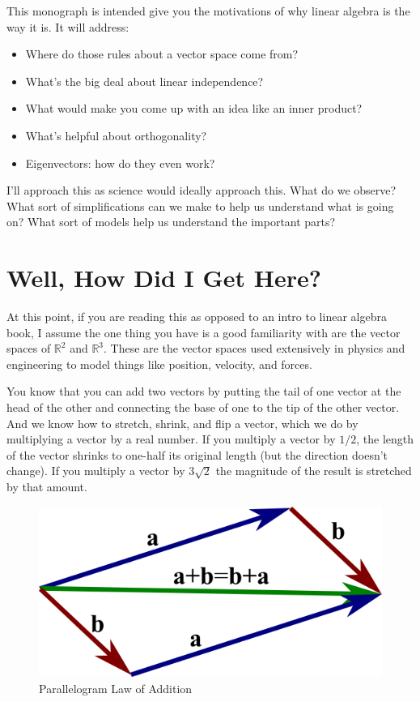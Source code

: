 \documentclass[
]{book}
\providecommand{\tightlist}{%
  \setlength{\itemsep}{0pt}\setlength{\parskip}{0pt}}
\begin{document}
This monograph is intended give you the motivations of why linear algebra is the way it is. It will address:

\begin{itemize}
\tightlist
\item
  Where do those rules about a vector space come from?
\item
  What's the big deal about linear independence?
\item
  What would make you come up with an idea like an inner product?
\item
  What's helpful about orthogonality?
\item
  Eigenvectors: how do they even work?
\end{itemize}

I'll approach this as science would ideally approach this. What do we observe? What sort of simplifications can we make to help us understand what is going on? What sort of models help us understand the important parts?

\hypertarget{well-how-did-i-get-here}{%
\chapter{Well, How Did I Get Here?}\label{well-how-did-i-get-here}}

At this point, if you are reading this as opposed to an intro to linear algebra book, I assume the one thing you have is a good familiarity with are the vector spaces of \(\mathbb{R}^2\) and \(\mathbb{R}^3\). These are the vector spaces used extensively in physics and engineering to model things like position, velocity, and forces.

You know that you can add two vectors by putting the tail of one vector at the head of the other and connecting the base of one to the tip of the other vector. And we know how to stretch, shrink, and flip a vector, which we do by multiplying a vector by a real number. If you multiply a vector by \(1/2\), the length of the vector shrinks to one-half its original length (but the direction doesn't change). If you multiply a vector by \(3 \sqrt{2}\) the magnitude of the result is stretched by that amount.

\begin{figure}

{\centering \includegraphics[width=0.75\linewidth,height=0.75\textheight]{images/vector_parallelogram_law} 

}

\caption{Parallelogram Law of Addition}\label{fig:unnamed-chunk-1}
\end{figure}
\end{document}
